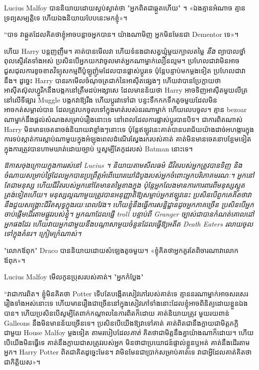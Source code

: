 {{Lucius Malfoy បាននិយាយដោយស្ងប់ស្ងាត់ថា "អ្នកពិតជាឆ្កួតហើយ" ។ «ឯង​គ្មាន​អំណាច គ្មាន​ទ្រព្យ​សម្បត្តិ​ទេ ហើយ​ឯង​និយាយ​បែប​នេះ​មក​ខ្ញុំ»។

“បាទ វាឆ្កួតដែលគិតថាខ្ញុំអាចបន្លាចអ្នកបាន។ យ៉ាងណាមិញ អ្នក​មិន​មែន​ជា Dementor ទេ»។

ហើយ Harry បន្តញញឹម។ គាត់​បាន​មើល​វា ហើយ​ទំនង​ជា​សត្វ​ឃ្មុំ​មួយ​ក្បាល​តម្លៃ \emph{នឹង} ព្យាបាល​ថ្នាំ​ពុល​ស្ទើរ​តែ​ទាំង​អស់ ប្រសិន​បើ​អ្នក​យក​វា​ចូល​មាត់​អ្នក​ណា​ម្នាក់​លឿន​ល្មម។ ប្រហែលជាវាមិនអាចជួសជុលការខូចខាតវិទ្យុសកម្មពីប៉ូឡូញ៉ូមដែលបានផ្លាស់ប្តូរទេ ប៉ុន្តែបន្ទាប់មកម្តងទៀត ប្រហែលជាវានឹង។ ដូច្នេះ Harry បានរកមើលចំណុចត្រជាក់នៃអាស៊ីតផ្សេងៗ ហើយវាបានប្រែក្លាយថាអាស៊ីតស៊ុលហ្វួរីកនឹងបង្កកនៅត្រឹមដប់អង្សាសេ ដែលមានន័យថា Harry អាចទិញអាស៊ីតមួយលីត្រនៅលើទីផ្សារ Muggle បង្កកវាឱ្យរឹង ហើយប្តូរវាទៅជា បន្ទះទឹកកកទឹកតូចមួយដែលមិនអាចកត់សម្គាល់បាន ដែលត្រូវបកចូលទៅក្នុងមាត់របស់នរណាម្នាក់ ហើយលេបចូល។ គ្មាន bezoar ណាម្នាក់នឹងផ្តល់សំណងសម្រាប់រឿងនោះទេ នៅពេលដែលការផ្លាស់ប្តូរបានបិទ។ ជាការពិតណាស់ Harry មិនមានចេតនាចង់និយាយវាខ្លាំងៗនោះទេ ប៉ុន្តែឥឡូវនេះគាត់បានបរាជ័យយ៉ាងដាច់អហង្ការក្នុងការទប់ស្កាត់ការស្លាប់ណាមួយក្នុងអំឡុងពេលដំណើរស្វែងរករបស់គាត់ គាត់មិនមានចេតនាបន្ថែមទៀតក្នុងការត្រូវបានហាមឃាត់ដោយច្បាប់ ឬសូម្បីតែកូដរបស់ Batman នោះទេ។

\emph{ ឱកាសចុងក្រោយក្នុងការរស់នៅ Lucius ។ និយាយតាមសីលធម៌ ជីវិតរបស់អ្នកត្រូវបានទិញ និងចំណាយសម្រាប់ថ្ងៃដែលអ្នកបានប្រព្រឹត្តអំពើឃោរឃៅដំបូងរបស់អ្នកចំពោះអ្នកបរិភោគមរណៈ។ អ្នក​នៅ​តែ​ជា​មនុស្ស ហើយ​ជីវិត​របស់​អ្នក​នៅ​តែ​មាន​តម្លៃ​ខាងក្នុង ប៉ុន្តែ​អ្នក​លែង​មាន​ការ​ការពារ​ពី​មនុស្ស​ស្លូតត្រង់​ទៀត​ហើយ។ មនុស្សល្អណាមួយត្រូវបានអនុញ្ញាតិឱ្យសម្លាប់អ្នកឥឡូវនេះ ប្រសិនបើពួកគេគិតថាវានឹងជួយសង្គ្រោះជីវិតសុទ្ធក្នុងរយៈពេលវែង។ ហើយខ្ញុំនឹងធ្វើការសន្និដ្ឋានដូចអ្នកភាគច្រើន ប្រសិនបើអ្នកចាប់ផ្តើមដើរតាមផ្លូវរបស់ខ្ញុំ។ អ្នកណាដែលផ្ញើ troll បន្ទាប់ពី Granger ច្បាស់ជាបានកំណត់គោលដៅអ្នកផងដែរ ហើយវាយអ្នកជាមួយនឹងបណ្តាសាមួយចំនួនដែលធ្វើឱ្យអតីត Death Eaters រលាយចូលទៅក្នុងគំនរ។ ក្រៀមក្រំណាស់។}

"លោកឪពុក" Draco បាននិយាយដោយសំឡេងតូចមួយ។ «ខ្ញុំ​គិត​ថា​អ្នក​គួរ​តែ​ពិចារណា​វា​លោក​ឪពុក»។

Lucius Malfoy មើលកូនប្រុសរបស់គាត់។ "អ្នកកំប្លែង"

“វា​ជា​ការ​ពិត។ ខ្ញុំមិនគិតថា Potter ទើបតែបង្កើតសៀវភៅរបស់គាត់ទេ គ្មាននរណាម្នាក់អាចសរសេររឿងទាំងអស់នោះទេ ហើយមានរឿងជាច្រើននៅក្នុងសៀវភៅទាំងនោះដែលខ្ញុំអាចពិនិត្យដោយខ្លួនឯងបាន។ ហើយប្រសិនបើសូម្បីតែពាក់កណ្តាលនៃការពិតក៏ដោយ គាត់និយាយត្រូវ មួយរយពាន់ Galleons នឹងមិនមានន័យច្រើនទេ។ ប្រសិនបើយើងឱ្យវាទៅគាត់ គាត់ពិតជានឹងក្លាយជាមិត្តភក្តិជាមួយ House Malfoy ម្តងទៀត តាមរបៀបដែល\emph{គាត់} គិតថាជាមិត្តនឹងគ្នាយ៉ាងណាក៏ដោយ។ ហើយ​បើ​យើង​មិន​ធ្វើ​ទេ គាត់​នឹង​ក្លាយ​ជា​សត្រូវ​របស់​អ្នក មិន​ថា​ជា​ប្រយោជន៍​ផ្ទាល់​ខ្លួន​ឬ​អត់ គាត់​នឹង​ដើរ​តាម​អ្នក។ Harry Potter ពិតជាគិតដូច្នេះមែន។ វា​មិន​មែន​ជា​ប្រាក់​សម្រាប់​គាត់​ទេ វា​ជា​អ្វី​ដែល​គាត់​គិត​ថា​ជា​កិត្តិយស»។

}}
